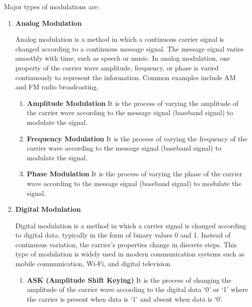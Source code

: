 Major types of modulations are:
\begin{enumerate}[label=\textbf{\arabic*.}, itemsep=6pt, parsep=12pt, leftmargin=*]
    \item \textbf{Analog Modulation}

    Analog modulation is a method in which a continuous carrier signal is changed according to a continuous message signal. The message signal varies smoothly with time, such as speech or music. In analog modulation, one property of the carrier wave amplitude, frequency, or phase is varied continuously to represent the information. Common examples include AM and FM radio broadcasting.

    \begin{enumerate}[
            label=\textbf{\alph*.},
            itemsep=6pt,
            parsep=6pt,
            leftmargin=*
        ]
        \item \textbf{Amplitude Modulation}  
        It is the process of varying the amplitude of the carrier wave according to the message signal (baseband signal) to modulate the signal.

        \item \textbf{Frequency Modulation}  
        It is the process of varying the frequency of the carrier wave according to the message signal (baseband signal) to modulate the signal.

        \item \textbf{Phase Modulation}  
        It is the process of varying the phase of the carrier wave according to the message signal (baseband signal) to modulate the signal.
    \end{enumerate}

    \item \textbf{Digital Modulation}  
    
    Digital modulation is a method in which a carrier signal is changed according to digital data, typically in the form of binary values 0 and 1. Instead of continuous variation, the carrier’s properties change in discrete steps. This type of modulation is widely used in modern communication systems such as mobile communication, Wi-Fi, and digital television.

    \begin{enumerate}[
            label=\textbf{\alph*.},
            itemsep=6pt,
            parsep=6pt,
            leftmargin=*
        ]
        \item \textbf{ASK (Amplitude Shift Keying)}  
        It is the process of changing the amplitude of the carrier wave according to the digital data `0' or `1' where the carrier is present when data is `1' and absent when data is `0'.


\end{enumerate}
\end{enumerate}

